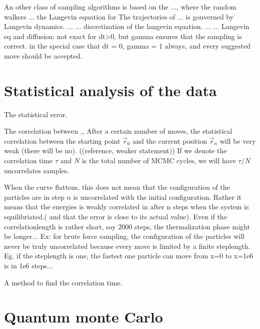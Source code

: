 \documentclass[a4paper,10pt,twocolumn]{article} %
\begin{document}
An other class of sampling algorithms is based on the ..., where the random walkers ... the Langevin equation for 
The trajectories of ... is gouverned by Langevin dynamics. 
...
...
discretization of the langevin equation.
...
...
Langevin eq and diffusion: not exact for dt>0, but gamma ensures that the sampling is correct. in the special case that 
dt = 0, gamma = 1 always, and every suggested move should be accepted. 


\section{Statistical analysis of the data}%

The statistical error.

The correlation between ,,
After a certain number of moves, the statistical correlation between
the starting point $\vec r_0$ and the current position $\vec r_n$ will be very weak (there will be no). 
((reference, weaker statement))
If we denote the correlation time $\tau$ and $N$ is the total number of MCMC cycles, 
we will have $\tau/N$ uncorrelates samples. 

When the curve flattens, this does not mean that the configuration of the particles are in step $n$ is uncorrelated with the initial configuration.
Rather it means that the energies is weakly correlated in after n steps when the system is equilibriated.( and that the error is close to its actual value). 
Even if the correlationlength is rather short, say 2000 steps, the thermalization phase might be longer...
Ex: for brute force sampling, the configuration of the particles will never be truly uncorrelated because every move is limited by a finite steplength.
Eg. if the steplength is one, the fastest one particle can move from x=0 to x=1e6 is in 1e6 steps...

A method to find the correlation time.

\section{Quantum monte Carlo}%
\end{document}
